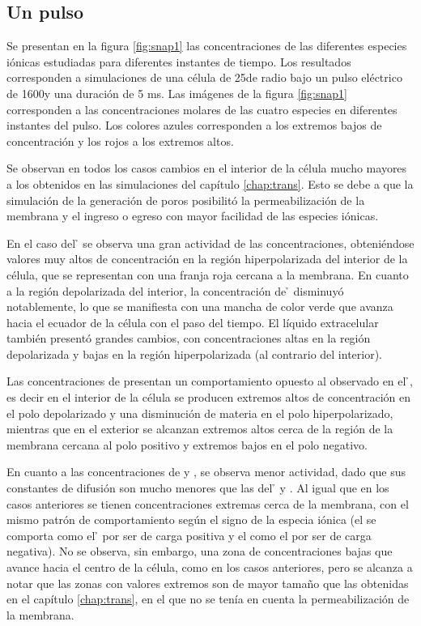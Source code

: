 \subsection*{Un pulso}

Se presentan en la figura \ref{fig:snap1} las concentraciones de las diferentes especies iónicas estudiadas para diferentes instantes de tiempo. Los resultados corresponden a simulaciones de una célula de 25\usec de radio bajo un pulso eléctrico de 1600\vcm y una duración de 5 \si{\milli\second}. Las imágenes de la figura \ref{fig:snap1} corresponden a las concentraciones molares de las cuatro especies en diferentes instantes del pulso. Los colores azules corresponden a los extremos bajos de concentración y los rojos a los extremos altos.

Se observan en todos los casos cambios en el interior de la célula mucho mayores a los obtenidos en las simulaciones del capítulo \ref{chap:trans}. Esto se debe a que la simulación de la generación de poros posibilitó la permeabilización de la membrana y el ingreso o egreso con mayor facilidad de las especies iónicas. 

En el caso del \h{} se observa una gran actividad de las concentraciones, obteniéndose valores muy altos de concentración en la región hiperpolarizada del interior de la célula, que se representan con una franja roja cercana a la membrana. En cuanto a la región depolarizada del interior, la concentración de \h{} disminuyó notablemente, lo que se manifiesta con una mancha de color verde que avanza hacia el ecuador de la célula con el paso del tiempo. El líquido extracelular también presentó grandes cambios, con concentraciones altas en la región depolarizada y bajas en la región hiperpolarizada (al contrario del interior).

Las concentraciones de \oh{} presentan un comportamiento opuesto al observado en el \h{}, es decir en el interior de la célula se producen extremos altos de concentración en el polo depolarizado y una disminución de materia en el polo hiperpolarizado, mientras que en el exterior se alcanzan extremos altos cerca de la región de la membrana cercana al polo positivo y extremos bajos en el polo negativo. 

En cuanto a las concentraciones de \na{} y \cl, se observa menor actividad, dado que sus constantes de difusión son mucho menores que las del \h{} y \oh. Al igual que en los casos anteriores se tienen concentraciones extremas cerca de la membrana, con el mismo patrón de comportamiento según el signo de la especia iónica (el \na{} se comporta como el \h{} por ser de carga positiva y el \cl{} como el \oh{} por ser de carga negativa). No se observa, sin embargo, una zona de concentraciones bajas que avance hacia el centro de la célula, como en los casos anteriores, pero se alcanza a notar que las zonas con valores extremos son de mayor tamaño que las obtenidas en el capítulo \ref{chap:trans}, en el que no se tenía en cuenta la permeabilización de la membrana.

